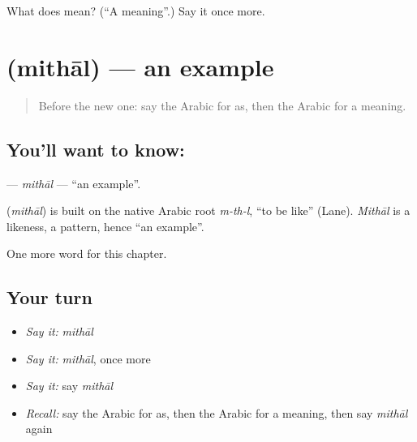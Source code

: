 \begin{tcolorbox}[breakable,colback=teal!4,colframe=teal!35!black,title={Before you move on}]
What does  mean? (\textquotedblleft{}A meaning\textquotedblright{}.) Say it once more.
\end{tcolorbox}
\section[\texorpdfstring{\ar{مثال} (mithāl)}{مثال (mithāl)}]{ (mithāl) — an example}

\label{lesson:AR-C208-mithal}



\begin{quote}
Before the new one: say the Arabic for as, then the Arabic for a meaning.
\end{quote}

\subsection*{You'll want to know: }
\textbf{} — \emph{mithāl} — \textquotedblleft{}an example\textquotedblright{}.

\begin{cousinweb}
\textbf{} (\emph{mithāl}) is built on the native Arabic root \emph{m-th-l}, \textquotedblleft{}to be like\textquotedblright{} (Lane). \emph{Mithāl} is a likeness, a pattern, hence \textquotedblleft{}an example\textquotedblright{}.
\end{cousinweb}

\begin{grammarlens}[title={What you've built}]
One more word for this chapter.
\end{grammarlens}

\subsection*{Your turn}
\begin{itemize}
\raggedright
  \item \emph{Say it:} \emph{mithāl}
  \item \emph{Say it:} \emph{mithāl}, once more
  \item \emph{Say it:} say \emph{mithāl}
  \item \emph{Recall:} say the Arabic for as, then the Arabic for a meaning, then say \emph{mithāl} again
\end{itemize}

